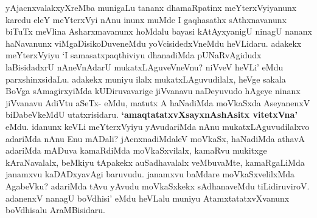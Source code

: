 \centerline{}

\begin{artha}
yAjacnxvalakxyXreMba munigaLu tananx dhamaRpatinx meYterxVyiyanunx
karedu eleY meYterxVyi nAnu inunx muMde I gaqhasathx sAthxnavanunx
biTuTx meVlina Asharxmavanunx hoMdalu bayasi kAtAyxyanigU ninagU
nananx haNavanunx viMgaDisikoDuveneMdu yoVcisidedxVneMdu
heVLidaru. adakekx meYterxVyiyu `I samasatxpaqthiviyu dhanadiMda
pUNaRvAgidudx laBisidadxrU nAneVnAdarU mukatxLAguveVneVnu? niVveV
heVLi' eMdu parxshinxsidaLu. adakekx muniyu
ilalx mukatxLAguvudilalx, heVge
sakala BoVga sAmagirxyiMda kUDiruvavarige jiVvanavu naDeyuvudo hAgeye
ninanx jiVvanavu AdiVtu aSeTx- eMdu, matutx A haNadiMda moVkaSxda
AseyanenxV biDabeVkeMdU utatxrisidaru. \textbf{`amaqtatatxvXsayxnAshAsitx vitetxVna'} eMdu. idanunx keVLi
meYterxVyiyu yAvudariMda nAnu mukatxLAguvudilalxvo adariMda nAnu Enu
mADali? jAcnxnadiMdaleV moVkaSx, haNadiMda athavA adariMda mADuva
kamaRdiMda moVkaSxvilalx, kamaRvu mukitxge kAraNavalalx, beMkiyu
tApakekx auSadhavalalx veMbuvaMte, kamaRgaLiMda janamxvu kaDADxyavAgi
baruvudu. janamxvu baMdare moVkaSxvelilxMda AgabeVku? adariMda tAvu
yAvudu moVkaSxkekx sAdhanaveMdu tiLidiruviroV. adanenxV nanagU boVdhisi'
eMdu heVLalu muniyu AtamxtatatxvXvanunx boVdhisalu AraMBisidaru.
\end{artha}

